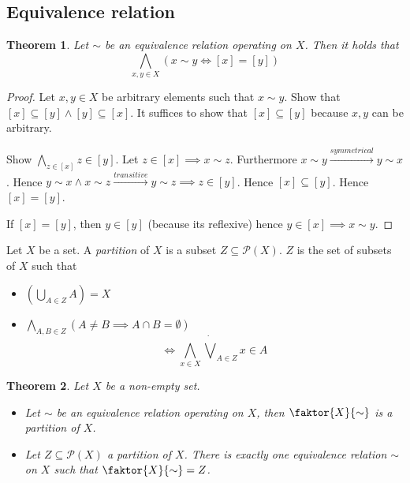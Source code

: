 \documentclass[a4paper,landscape,twocolumn]{article}
\newtheorem{theorem}{Theorem}[section]
\begin{document}
\subsection{Equivalence relation}

\begin{theorem}
  \label{satz-1.2.9}
  Let $\sim$ be an equivalence relation operating on $X$.
  Then it holds that
  \[ \bigwedge_{x,y \in X} \left(x \sim y \iff [x] = [y]\right) \]
\end{theorem}
\begin{proof}
  Let $x,y \in X$ be arbitrary elements such that $x \sim y$.
  Show that $[x] \subseteq [y] \land [y] \subseteq [x]$.
  It suffices to show that $[x] \subseteq [y]$ because $x,y$ can be arbitrary.

  Show $\bigwedge_{z \in [x]} z \in [y]$.
  Let $z \in [x] \implies x \sim z$. Furthermore $x \sim y \xrightarrow{symmetrical} y \sim x$.
  Hence $y \sim x \land x \sim z \xrightarrow{transitive} y \sim z \implies z \in [y]$.
  Hence $[x] \subseteq [y]$. Hence $[x] = [y]$.

  If $[x] = [y]$, then $y \in [y]$ (because its reflexive) hence $y \in [x] \implies x \sim y$.
\end{proof}

Let $X$ be a set. A \emph{partition} of $X$ is a subset $Z \subseteq \mathcal{P}(X)$.
$Z$ is the set of subsets of $X$ such that
%
\begin{itemize}
  \item $\left(\bigcup_{A \in Z} A\right) = X$
  \item $\bigwedge_{A,B \in Z} \left(A \neq B \implies A \cap B = \emptyset\right)$
    \[ \iff \bigwedge_{x \in X} \dot\bigvee_{A \in Z} x \in A \]
\end{itemize}

\begin{theorem}
  Let $X$ be a non-empty set.
  \begin{itemize}
    \item
      Let $\sim$ be an equivalence relation operating on $X$,
      then $\faktor{X}{\sim}$ is a partition of $X$.
    \item
      Let $Z \subseteq \mathcal{P}(X)$ a partition of $X$.
      There is exactly one equivalence relation $\sim$ on $X$
      such that $\faktor{X}{\sim} = Z$.
  \end{itemize}
\end{theorem}
\end{document}
